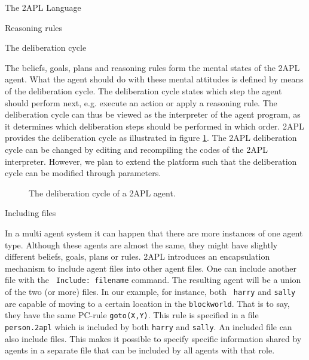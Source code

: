 \begin{chapter}{The 2APL Language}
\begin{section}{Reasoning rules}
\begin{subsection}
\end{subsection}
\end{section}


\begin{section}{The deliberation cycle}

The beliefs, goals, plans and reasoning rules form the mental states
of the 2APL agent. What the agent should do with these mental
attitudes is defined by means of the deliberation cycle. The
deliberation cycle states which step the agent should perform next,
e.g. execute an action or apply a reasoning rule. The deliberation
cycle can thus be viewed as the interpreter of the agent program, as
it determines which deliberation steps should be performed in which
order. 2APL provides the deliberation cycle as illustrated in figure
\ref{fig:delib}. The 2APL deliberation cycle can be changed by
editing and recompiling the codes of the 2APL interpreter. However,
we plan to extend the platform such that the deliberation cycle can
be modified through parameters.

\begin{figure}[ht]
    \caption{The deliberation cycle of a 2APL agent.}\label{fig:delib}
\end{figure}

\end{section}


\begin{section}{Including files}\label{sec:include}

In a multi agent system it can happen that there are more instances
of one agent type. Although these agents are almost the same, they
might have slightly different beliefs, goals, plans or rules. 2APL
introduces an encapsulation mechanism to include agent files into
other agent files. One can include another file with the {\tt
Include: filename} command. The resulting agent will be a union of
the two (or more) files. In our example, for instance, both {\tt
harry} and {\tt sally} are capable of moving to a certain location
in the {\tt blockworld}. That is to say, they have the same PC-rule
{\tt goto(X,Y)}. This rule is specified in a file {\tt person.2apl}
which is included by both {\tt harry} and {\tt sally}. An included
file can also include files. This makes it possible to specify
specific information shared by agents in a separate file that can be
included by all agents with that role.
\end{section}



\end{chapter}

